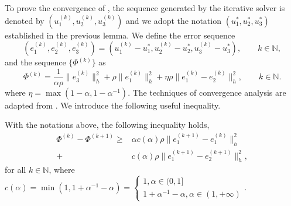 To prove the convergence of , the sequence generated by the iterative solver is denoted by $(u_1^{(k)},u_2^{(k)},u_3^{(k)})$ and we adopt the notation $(u_1^*,u_2^*,u_3^*)$ established in the previous lemma. 
We define the error sequence
\begin{equation}
    (e_1^{(k)},e_2^{(k)},e_3^{(k)})=(u_1^{(k)}-u_1^*,u_2^{(k)}-u_2^*,u_3^{(k)}-u_3^*),\qquad k\in \mathbb{N},
\end{equation}
and the sequence $\{\Phi^{(k)}\}$ as
\begin{equation}\label{def:Phi}
    \Phi^{(k)}=\frac{1}{\alpha\rho}\|e_3^{(k)}\|_h^2+\rho\|e_1^{(k)}\|_h^2+
    \eta\rho\|e_1^{(k)}-e_2 ^{(k)}\|_h^2,\qquad k\in \mathbb{N}.
\end{equation}
where $\eta=\max(1-\alpha,1-\alpha^{-1})$. The techniques of convergence analysis are adapted from \cites{neal2011distributed,chen2017note,li2025overcoming}. 
We introduce the following useful inequality.
\begin{lemma}\label{lemma:Phi}
With the notations above, the following inequality holds,
\begin{equation}
\begin{aligned}
    \Phi^{(k)}-\Phi^{(k+1)}\geq 
    &\alpha c(\alpha)\rho\|e_1^{(k+1)}-e_1^{(k)}\|_h^2\\+
    &c(\alpha)\rho\|e_1^{(k+1)}-e_2^{(k+1)}\|_h^2,
\end{aligned}
\end{equation}
for all $k \in \mathbb{N}$, where $c(\alpha)=\min(1,1+\alpha^{-1}-\alpha)=\begin{cases}
    1,\alpha \in (0,1]\\
    1+\alpha^{-1}-\alpha,\alpha \in (1,+\infty)
\end{cases}$.
\end{lemma}
